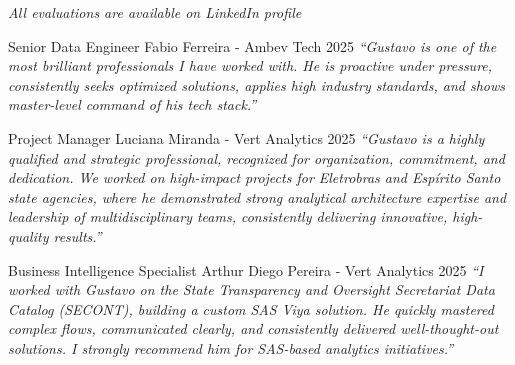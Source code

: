 
\textit{ \small All evaluations are available on LinkedIn profile}

\begin{cventries}

  
  \cventry
    {Senior Data Engineer} %
    {Fabio Ferreira - Ambev Tech} %
    {2025} %
    {} %
    {
      \textit{``Gustavo is one of the most brilliant professionals I have worked with. He is proactive under pressure, consistently seeks optimized solutions, applies high industry standards, and shows master-level command of his tech stack.''}
    }

  \cventry
    {Project Manager} %
    {Luciana Miranda - Vert Analytics} %
    {2025} %
    {} %
    {
      \textit{``Gustavo is a highly qualified and strategic professional, recognized for organization, commitment, and dedication. We worked on high-impact projects for Eletrobras and Espírito Santo state agencies, where he demonstrated strong analytical architecture expertise and leadership of multidisciplinary teams, consistently delivering innovative, high-quality results.''}
    }

  \cventry
    {Business Intelligence Specialist} %
    {Arthur Diego Pereira - Vert Analytics} %
    {2025} %
    {} %
    {
      \textit{``I worked with Gustavo on the State Transparency and Oversight Secretariat Data Catalog (SECONT), building a custom SAS Viya solution. He quickly mastered complex flows, communicated clearly, and consistently delivered well-thought-out solutions. I strongly recommend him for SAS-based analytics initiatives.''}
    }


\end{cventries}
